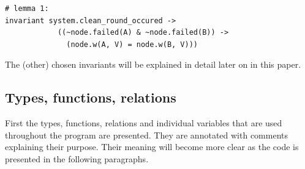 \documentclass[fleqn]{article}
\begin{document}
\begin{mdframed}[nobreak=true, backgroundcolor=light-gray, roundcorner=10pt,leftmargin=1, rightmargin=1, innerleftmargin=15, innertopmargin=15,innerbottommargin=15, outerlinewidth=1, linecolor=light-gray]
\begin{lstlisting}
# lemma 1:
invariant system.clean_round_occured ->
            ((~node.failed(A) & ~node.failed(B)) ->
              (node.w(A, V) = node.w(B, V)))
\end{lstlisting}
\end{mdframed}

\noindent The (other) chosen invariants will be explained in detail later on in this paper.

\subsection{Types, functions, relations}
First the types, functions, relations and individual variables that are used throughout the program are presented. They are annotated with comments explaining their purpose.  Their meaning will become more clear as the code is presented in the following paragraphs.
\end{document}
